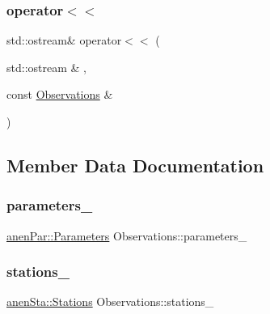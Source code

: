 \subsubsection{\texorpdfstring{operator$<$$<$}{operator<<}}
{\footnotesize\ttfamily std\+::ostream\& operator$<$$<$ (\begin{DoxyParamCaption}\item[{std\+::ostream \&}]{,  }\item[{const \mbox{\hyperlink{class_observations}{Observations}} \&}]{ }\end{DoxyParamCaption})\hspace{0.3cm}{\ttfamily [friend]}}



\subsection{Member Data Documentation}
\mbox{\label{class_observations_a9e80eaaa9c096dda1dbbe8fcf631c087}} 
\subsubsection{\texorpdfstring{parameters\+\_\+}{parameters\_}}
{\footnotesize\ttfamily \mbox{\hyperlink{classanen_par_1_1_parameters}{anen\+Par\+::\+Parameters}} Observations\+::parameters\+\_\+\hspace{0.3cm}{\ttfamily [protected]}}

\mbox{\label{class_observations_a03e2d3c69e46066f48e4381657a995f7}} 
\subsubsection{\texorpdfstring{stations\+\_\+}{stations\_}}
{\footnotesize\ttfamily \mbox{\hyperlink{classanen_sta_1_1_stations}{anen\+Sta\+::\+Stations}} Observations\+::stations\+\_\+\hspace{0.3cm}{\ttfamily [protected]}}

\mbox{\label{class_observations_ad379be63239b03e0db53dc31014a2d74}} 
